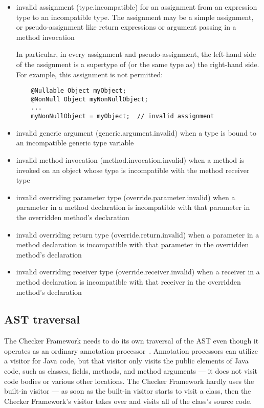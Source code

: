 \begin{itemize}

\item invalid assignment (type.incompatible) for an assignment from
  an expression type to an incompatible type.  The assignment may be a
  simple assignment, or pseudo-assignment like return expressions or
  argument passing in a method invocation

  In particular, in every assignment and pseudo-assignment, the
  left-hand side of the assignment is a supertype of (or the same type
  as) the right-hand side.  For example, this assignment is not
  permitted:

  \begin{Verbatim}
    @Nullable Object myObject;
    @NonNull Object myNonNullObject;
    ...
    myNonNullObject = myObject;  // invalid assignment
  \end{Verbatim}

\item invalid generic argument (generic.argument.invalid) when a type
  is bound to an incompatible generic type variable

\item invalid method invocation (method.invocation.invalid) when a
  method is invoked on an object whose type is incompatible with the
  method receiver type

\item invalid overriding parameter type (override.parameter.invalid)
  when a parameter in a method declaration is incompatible with that
  parameter in the overridden method's declaration

\item invalid overriding return type (override.return.invalid) when a
  parameter in a method declaration is incompatible with that
  parameter in the overridden method's declaration

\item invalid overriding receiver type (override.receiver.invalid)
  when a receiver in a method declaration is incompatible with that
  receiver in the overridden method's declaration

\end{itemize}


\subsection{AST traversal\label{ast-traversal}}

The Checker Framework needs to do its own traversal of the AST even though
it operates as an ordinary annotation processor~\cite{JSR269}.  Annotation
processors can utilize a visitor for Java code, but that visitor only
visits the public elements of Java code, such as classes, fields, methods,
and method arguments --- it does not visit code bodies or various other
locations.  The Checker Framework hardly uses the built-in visitor --- as
soon as the built-in visitor starts to visit a class, then the Checker
Framework's visitor takes over and visits all of the class's source code.

